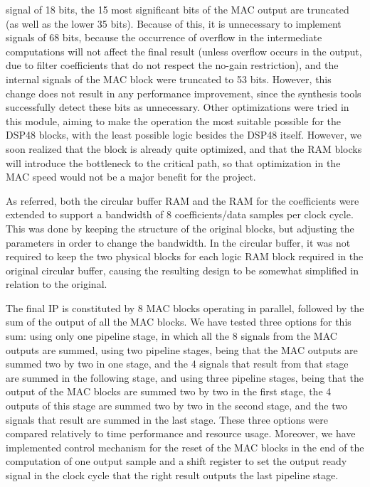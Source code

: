 \documentclass[12pt]{article}
\begin{document}
signal of 18 bits, the 15 most significant bits of the MAC output are truncated (as well as the
lower 35 bits). Because of this, it is unnecessary to implement signals of 68 bits, because the
occurrence of overflow in the intermediate computations will not affect the final result (unless
overflow occurs in the output, due to filter coefficients that do not respect the no-gain
restriction), and the internal signals of the MAC block were truncated to 53 bits. However, this
change does not result in any performance improvement, since the synthesis tools successfully detect
these bits as unnecessary. Other optimizations were tried in this module, aiming to make the
operation the most suitable possible for the DSP48 blocks, with the least possible logic besides the
DSP48 itself. However, we soon realized that the block is already quite optimized, and that the RAM
blocks will introduce the bottleneck to the critical path, so that optimization in the MAC speed
would not be a major benefit for the project.

As referred, both the circular buffer RAM and the RAM for the coefficients were extended to support
a bandwidth of 8 coefficients/data samples per clock cycle. This was done by keeping the structure
of the original blocks, but adjusting the parameters in order to change the bandwidth. In the
circular buffer, it was not required to keep the two physical blocks for each logic RAM block
required in the original circular buffer, causing the resulting design to be somewhat simplified in
relation to the original.

The final IP is constituted by 8 MAC blocks operating in parallel, followed by the sum of the output
of all the MAC blocks. We have tested three options for this sum: using only one pipeline stage, in
which all the 8 signals from the MAC outputs are summed, using two pipeline stages, being that the
MAC outputs are summed two by two in one stage, and the 4 signals that result from that stage are
summed in the following stage, and using three pipeline stages, being that the output of the MAC
blocks are summed two by two in the first stage, the 4 outputs of this stage are summed two by two
in the second stage, and the two signals that result are summed in the last stage. These three
options were compared relatively to time performance and resource usage. Moreover, we have
implemented control mechanism for the reset of the MAC blocks in the end of the computation of one
output sample and a shift register to set the output ready signal in the clock cycle that the right
result outputs the last pipeline stage.
\end{document}
